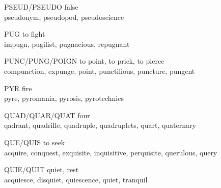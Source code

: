 \begin{flashcard}[Roots]{PSEUD/PSEUDO}
false\\
\vspace{0.2in}
pseudonym, pseudopod, pseudoscience\\
\end{flashcard}

\begin{flashcard}[Roots]{PUG}
to fight\\
\vspace{0.2in}
impugn, pugilist, pugnacious, repugnant\\
\end{flashcard}

\begin{flashcard}[Roots]{PUNC/PUNG/POIGN}
to point, to prick, to pierce\\
\vspace{0.2in}
compunction, expunge, point, punctilious, puncture, pungent\\
\end{flashcard}

\begin{flashcard}[Roots]{PYR}
fire\\
\vspace{0.2in}
pyre, pyromania, pyrosis, pyrotechnics\\
\end{flashcard}

\begin{flashcard}[Roots]{QUAD/QUAR/QUAT}
four\\
\vspace{0.2in}
qadrant, quadrille, quadruple, quadruplets, quart, quaternary\\
\end{flashcard}

\begin{flashcard}[Roots]{QUE/QUIS}
to seek\\
\vspace{0.2in}
acquire, conquest, exquisite, inquisitive, perquisite, querulous, query\\
\end{flashcard}

\begin{flashcard}[Roots]{QUIE/QUIT}
quiet, rest\\
\vspace{0.2in}
acquiesce, disquiet, quiescence, quiet, tranquil\\
\end{flashcard}

